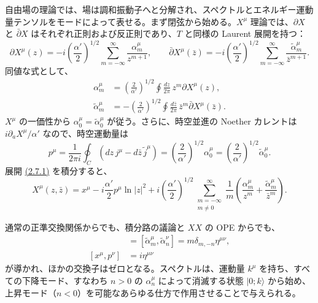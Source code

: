 \label{sec:2.7}

自由場の理論では、場は調和振動子へと分解され、スペクトルとエネルギー運動量テンソルをモードによって表せる。まず閉弦から始める。$X^\mu$ 理論では、$\partial X$ と $\bar\partial X$ はそれぞれ正則および反正則であり、$T$ と同様の Laurent 展開を持つ：
\begin{equation}
\partial X^\mu(z)=-i\left(\frac{\alpha'}2\right)^{1/2}
\sum_{m=-\infty}^{\infty}\frac{\alpha_m^\mu}{z^{m+1}},
\qquad
\bar\partial X^\mu(\bar z)=-i\left(\frac{\alpha'}2\right)^{1/2}
\sum_{m=-\infty}^{\infty}\frac{\widetilde\alpha_m^\mu}{\bar z^{m+1}}.
\tag{2.7.1}\label{eq:2.7.1}
\end{equation}
同値な式として、
\begin{align}
\alpha_m^\mu&=\left(\frac2{\alpha'}\right)^{1/2}
\oint\frac{dz}{2\pi}\,z^m\partial X^\mu(z),
\tag{2.7.2a}\label{eq:2.7.2a}\\
\widetilde\alpha_m^\mu&=-\left(\frac2{\alpha'}\right)^{1/2}
\oint\frac{d\bar z}{2\pi}\,\bar z^m\bar\partial X^\mu(\bar z).
\tag{2.7.2b}\label{eq:2.7.2b}
\end{align}
$X^\mu$ の一価性から $\alpha_0^\mu=\widetilde\alpha_0^\mu$ が従う。さらに、時空並進の Noether カレントは $i\partial_aX^\mu/\alpha'$ なので、時空運動量は
\begin{equation}
p^\mu=\frac1{2\pi i}\oint_C
(dz\,j^\mu-d\bar z\,\widetilde j^\mu)
=\left(\frac2{\alpha'}\right)^{1/2}\alpha_0^\mu
=\left(\frac2{\alpha'}\right)^{1/2}\widetilde\alpha_0^\mu.
\tag{2.7.3}\label{eq:2.7.3}
\end{equation}
展開 \hyperref[eq:2.7.1]{(2.7.1)} を積分すると、
\begin{equation}
X^\mu(z,\bar z)=x^\mu-i\frac{\alpha'}2p^\mu\ln|z|^2
+i\left(\frac{\alpha'}2\right)^{1/2}
\sum_{\substack{m=-\infty\\m\ne0}}^\infty
\frac1m\left(\frac{\alpha_m^\mu}{z^m}
+\frac{\widetilde\alpha_m^\mu}{\bar z^m}\right).
\tag{2.7.4}\label{eq:2.7.4}
\end{equation}

通常の正準交換関係からでも、積分路の議論と $XX$ の OPE からでも、
\begin{align}
[\alpha_m^\mu,\alpha_n^\nu]
&=[\widetilde\alpha_m^\mu,\widetilde\alpha_n^\nu]
=m\delta_{m,-n}\eta^{\mu\nu},
\tag{2.7.5a}\label{eq:2.7.5a}\\
[x^\mu,p^\nu]&=i\eta^{\mu\nu}
\tag{2.7.5b}\label{eq:2.7.5b}
\end{align}
が導かれ、ほかの交換子はゼロとなる。スペクトルは、運動量 $k^\mu$ を持ち、すべての下降モード、すなわち $n>0$ の $\alpha_n^\mu$ によって消滅する状態 $\lvert0;k\rangle$ から始め、上昇モード（$n<0$）を可能なあらゆる仕方で作用させることで与えられる。

